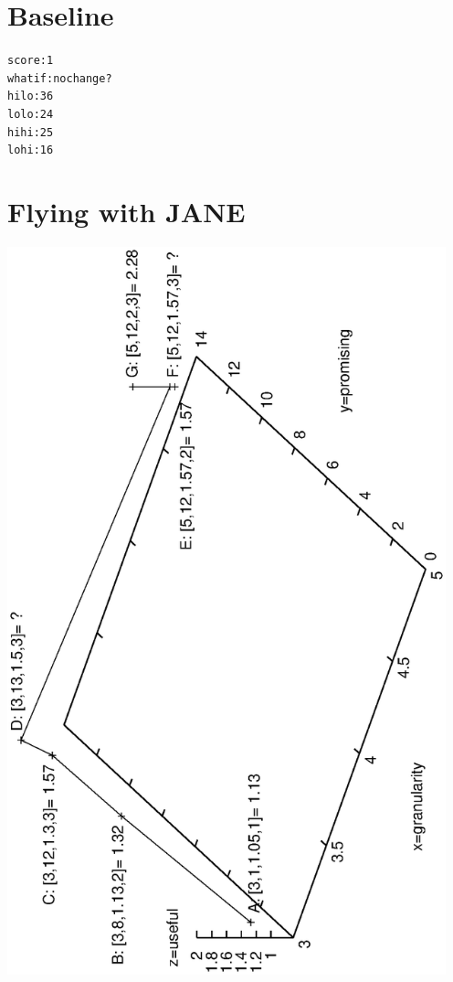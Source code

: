 \documentclass{article}
\begin{document}
\section{Baseline}
 {\footnotesize \begin{alltt}
          score :    1
        what if : no change?
           hilo :   36%
           lolo :   24%
           hihi :   25%
           lohi :   16%
\end{alltt}}

\clearpage
\section{Flying with JANE}

\begin{center}
\includegraphics[angle=270,width=5in]{control.eps}
\end{center}
\end{document}
